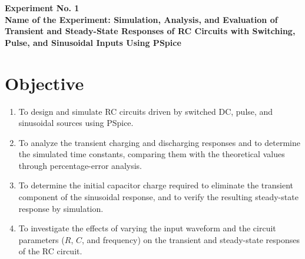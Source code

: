 \documentclass[12pt,a4paper]{article}
\newcommand{\expnumber}{1}
\begin{document}
	
	
	
	\setcounter{page}{1}
	
	\begin{center}
		{\large\bfseries Experiment No. \expnumber}\\[4pt]
		{\large\bfseries Name of the Experiment: Simulation, Analysis, and
			Evaluation of Transient and Steady-State Responses of RC Circuits
			with Switching, Pulse, and Sinusoidal Inputs Using PSpice}
	\end{center}
	\vspace{6pt}
	
	\section{Objective}
	\begin{enumerate}[label=\roman*., leftmargin=2.5em]
		\item To design and simulate RC circuits driven by switched DC,
		pulse, and sinusoidal sources using PSpice.
		\item To analyze the transient charging and discharging responses and
		to determine the simulated time constants, comparing them with
		the theoretical values through percentage-error analysis.
		\item To determine the initial capacitor charge required to
		eliminate the transient component of the sinusoidal response,
		and to verify the resulting steady-state response by
		simulation.
		\item To investigate the effects of varying the input waveform and
		the circuit parameters ($R$, $C$, and frequency) on the
		transient and steady-state responses of the RC circuit.
	\end{enumerate}
	
\end{document}
